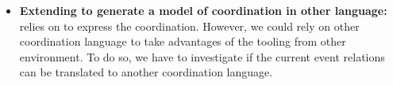 \begin{itemize}
	\item \textbf{Extending \bcool to generate a model of coordination in other language:} \bcool relies on \ccsl to express the coordination. However, we could rely on other coordination language to take advantages of the tooling from other environment. To do so, we have to investigate if the current event relations can be translated to another coordination language.
\end{itemize}
